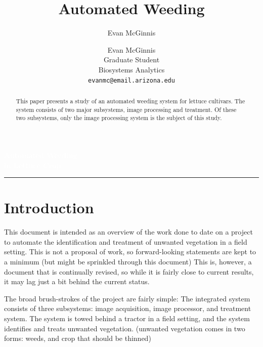 \documentclass[letterpaper]{article}
\author{Evan McGinnis}
\title{Automated Weeding}
\author{%
    Evan McGinnis \\
    Graduate Student \\
    Biosystems Analytics \\
    \texttt{evanmc@email.arizona.edu}\vspace{40pt} \\
    }
\makeatletter
\def\printauthor{%
    {\large \@author}}
\makeatother
\begin{document}
\begin{titlepage}
\BgThispage
{}
\vspace*{1cm}
\noindent
\textcolor{white}{\Huge\textbf{\textsf{Automated Weeding\\ in Lettuce Crop}}}
\vspace*{2.5cm}\par
\noindent
\begin{minipage}{0.35\linewidth}
    \begin{flushright}
        \printauthor
    \end{flushright}
\end{minipage} \hspace{15pt}
%
\begin{minipage}{0.02\linewidth}
    \rule{1pt}{175pt}
\end{minipage} \hspace{-10pt}
%
\begin{minipage}{0.6\linewidth}
\vspace{5pt}
    \begin{abstract} 
This paper presents a study of an automated weeding system for lettuce cultivars.  The system consists of two major subsystems, image processing and treatment. Of these two subsystems, only the image processing system is the subject of this study.
    \end{abstract}
\end{minipage}
\end{titlepage}
\restoregeometry
%
%
\tableofcontents
\listoffigures
\newpage

%
%



\section{Introduction}

This document is intended as an overview of the work done to date on a project to automate the identification and treatment of unwanted vegetation in a field setting. This is not a proposal of work, so forward-looking statements are kept to a minimum (but might be sprinkled through this document) This is, however, a document that is continually revised, so while it is fairly close to current results, it may lag just a bit behind the current status.

The broad brush-strokes of the project are fairly simple:
The integrated system consists of three subsystems: image acquisition, image processor, and treatment system.
The system is towed behind a tractor in a field setting, and the system identifies and treats unwanted vegetation. (unwanted vegetation comes in two forms: weeds, and crop that should be thinned)
\end{document}
